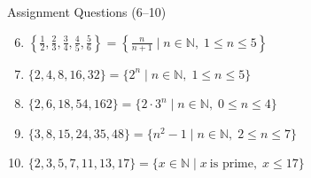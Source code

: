 
\begin{frame}{Assignment Questions (6--10)}

\small

\begin{enumerate}
\setcounter{enumi}{5}

\item
$\left\{\frac{1}{2},\frac{2}{3},\frac{3}{4},\frac{4}{5},\frac{5}{6}\right\}
=
\left\{\frac{n}{n+1}\mid n\in\mathbb N,\;1\le n\le5\right\}$

\vspace{0.45cm}

\item
$\{2,4,8,16,32\}
=
\{2^n\mid n\in\mathbb N,\;1\le n\le5\}$

\vspace{0.45cm}

\item
$\{2,6,18,54,162\}
=
\{2\cdot3^n\mid n\in\mathbb N,\;0\le n\le4\}$

\vspace{0.45cm}

\item
$\{3,8,15,24,35,48\}
=
\{n^2-1\mid n\in\mathbb N,\;2\le n\le7\}$

\vspace{0.45cm}

\item
$\{2,3,5,7,11,13,17\}
=
\{x\in\mathbb N\mid x\ \text{is prime},\;x\le17\}$

\end{enumerate}

\end{frame}